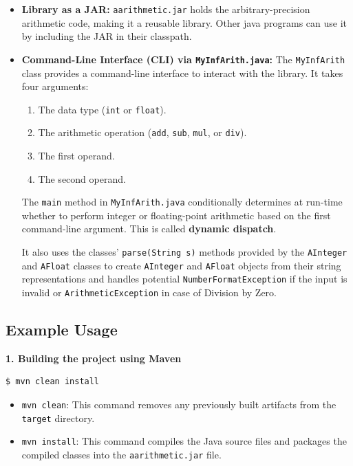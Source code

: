 \documentclass[a4paper,12pt]{article}
\begin{document}
\begin{itemize}
    \item \textbf{Library as a JAR:} \texttt{aarithmetic.jar} holds the arbitrary-precision arithmetic code, making it a reusable library. Other java programs can use it by including the JAR in their classpath.
    \item \textbf{Command-Line Interface (CLI) via \texttt{MyInfArith.java}:} The \texttt{MyInfArith} class provides a command-line interface to interact with the library. It takes four arguments:
    \begin{enumerate}
        \item The data type (\texttt{int} or \texttt{float}).
        \item The arithmetic operation (\texttt{add}, \texttt{sub}, \texttt{mul}, or \texttt{div}).
        \item The first operand.
        \item The second operand.
    \end{enumerate}
   
    The \texttt{main} method in \texttt{MyInfArith.java} conditionally determines at run-time whether to perform integer or floating-point arithmetic based on the first command-line argument. This is called \textbf{dynamic dispatch}.

    It also uses the classes' \texttt{parse(String s)} methods provided by the \texttt{AInteger} and \texttt{AFloat} classes to create \texttt{AInteger} and \texttt{AFloat} objects from their string representations and handles potential \texttt{NumberFormatException} if the input is invalid or \texttt{ArithmeticException} in case of Division by Zero.
\end{itemize}

\subsection{Example Usage}

\textbf{1. Building the project using Maven}

\begin{lstlisting}[language=bash, basicstyle=\ttfamily\footnotesize, frame=single]
$ mvn clean install
\end{lstlisting}

\begin{itemize}
    \item \texttt{mvn clean}: This command removes any previously built artifacts from the \texttt{target} directory.
    \item \texttt{mvn install}: This command compiles the Java source files and packages the compiled classes into the \texttt{aarithmetic.jar} file.
\end{itemize}
\end{document}
